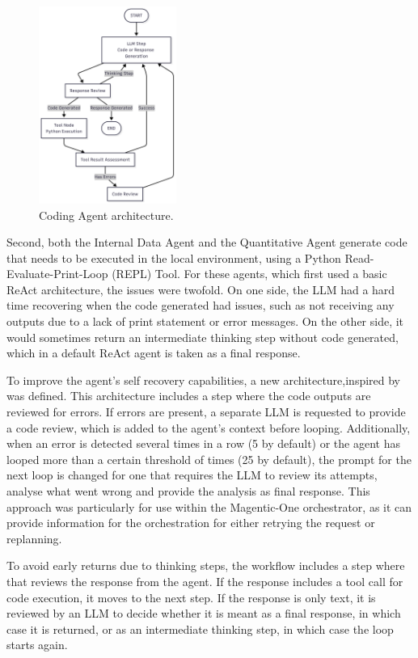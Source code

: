 \documentclass[a4paper]{report}
\begin{document}
\begin{figure}[h]
\centering
\includegraphics[width=0.4\textwidth]{images/coding-workflow.png}
\caption{Coding Agent architecture.}
\label{fig:coding-workflow}
\end{figure}

Second, both the Internal Data Agent and the Quantitative Agent generate code that needs to be executed in the local environment, using a Python Read-Evaluate-Print-Loop (REPL) Tool. For these agents, which first used a basic ReAct architecture, the issues were twofold. On one side, the LLM had a hard time recovering when the code generated had issues, such as not receiving any outputs due to a lack of print statement or error messages. On the other side, it would sometimes return an intermediate thinking step without code generated, which in a default ReAct agent is taken as a final response.

To improve the agent's self recovery capabilities, a new architecture,inspired by \cite{shinn2023reflexion} was defined. This architecture includes a step where the code outputs are reviewed for errors. If errors are present, a separate LLM is requested to provide a code review, which is added to the agent's context before looping. Additionally, when an error is detected several times in a row (5 by default) or the agent has looped more than a certain threshold of times (25 by default), the prompt for the next loop is changed for one that requires the LLM to review its attempts, analyse what went wrong and provide the analysis as final response. This approach was particularly for use within the Magentic-One orchestrator, as it can provide information for the orchestration for either retrying the request or replanning.

To avoid early returns due to thinking steps, the workflow includes a step where that reviews the response from the agent. If the response includes a tool call for code execution, it moves to the next step. If the response is only text, it is reviewed by an LLM to decide whether it is meant as a final response, in which case it is returned, or as an intermediate thinking step, in which case the loop starts again.
\end{document}
